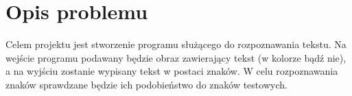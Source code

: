\section{Opis problemu}
	Celem projektu jest stworzenie programu służącego do rozpoznawania tekstu.
	Na wejście programu podawany będzie obraz zawierający tekst (w kolorze bądź nie), a na wyjściu zostanie wypisany tekst w postaci znaków.
	W celu rozpoznawania znaków sprawdzane będzie ich podobieństwo do znaków testowych.